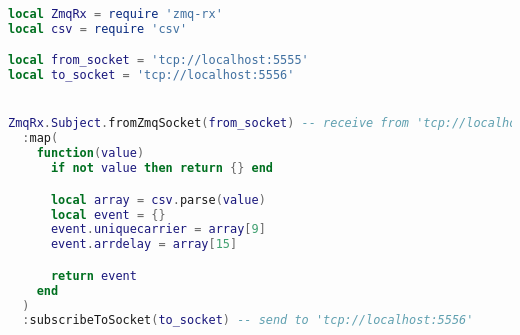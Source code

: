 \begin{lstlisting}[language=LUA,caption={Process pipeline with Zmq-RxLua: mapper.},label=rx-processing-map-csv-to-event]
local ZmqRx = require 'zmq-rx'
local csv = require 'csv'

local from_socket = 'tcp://localhost:5555'
local to_socket = 'tcp://localhost:5556'


ZmqRx.Subject.fromZmqSocket(from_socket) -- receive from 'tcp://localhost:5555'
  :map(
    function(value)
      if not value then return {} end

      local array = csv.parse(value)
      local event = {}
      event.uniquecarrier = array[9]
      event.arrdelay = array[15]

      return event
    end
  )
  :subscribeToSocket(to_socket) -- send to 'tcp://localhost:5556'
\end{lstlisting}
